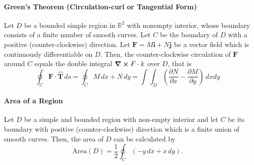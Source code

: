 \paragraph{Green's Theorem (Circulation-curl or Tangential Form)}
Let \(D\) be a bounded simple region in \(\mathbb R^2\) with nonempty interior, whose boundary consists of a finite number of smooth curves. Let \(C\) be the boundary of \(D\) with a positive (counter-clockwise) direction. Let \(\textbf{F} = M\textbf{i} + N\textbf{j}\) be a vector field which is continuously differentiable on \(D\). Then, the counter-clockwise circulation of \(\textbf{F}\) around \(C\) equals the double integral \(\curl F \cdot k\) over \(D\), that is
\[\oint_C \textbf{F} \cdot \hat{\textbf{T}} \, ds = \oint_C M \, dx + N \, dy = \int\int_D \left(\frac{\partial N}{\partial x} - \frac{\partial M}{\partial y} \right) \, dxdy\]

\paragraph{Area of a Region}
Let \(D\) be a simple and bounded region with non-empty interior and let \(C\) be its boundary with positive (counter-clockwise) direction which is a finite union of smooth curves. Then, the area of \(D\) can be calculated by 
\[\text{Area}(D) = \frac{1}{2}\oint_C (-y \, dx + x \, dy).\]